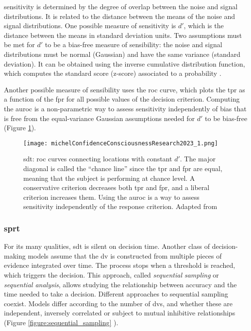 \Gls{sensitivity} is determined by the degree of overlap between the noise and signal distributions. It is related to the distance between the means of the noise and signal distributions. One possible measure of \gls{sensitivity} is $d'$, which is the distance between the means in standard deviation units. Two assumptions must be met for $d'$ to be a bias-free measure of sensibility: the noise and signal distributions must be normal (Gaussian) and have the same variance (standard deviation). It can be obtained using the inverse cumulative distribution function, which computes the standard score (z-score) associated to a probability \cite{stanislawCalculationSignalDetection1999}.

Another possible measure of sensibility uses the \acrfull{roc} curve, which plots the \acrlong{tpr} as a function of the \acrlong{fpr} for all possible values of the decision criterion. Computing the \acrfull{auroc} is a non-parametric way to assess \gls{sensitivity} independently of bias that is free from the equal-variance Gaussian assumptions needed for $d'$ to be bias-free \cite{flemingHowMeasureMetacognition2014} (Figure \ref{figure:roc_curves}).

\begin{figure}[ht]
    \centering
    \texttt{[image: michelConfidenceConsciousnessResearch2023\_1.png]}
    \caption[\acrlong{sdt}: \acrshort{roc} curves]{\acrlong{sdt}: \acrshort{roc} curves connecting locations with constant $d'$. The major diagonal is called the “chance line” since the \acrlong{tpr} and \acrlong{fpr} are equal, meaning that the subject is performing at chance level. A conservative criterion decreases both \acrshort{tpr} and \acrshort{fpr}, and a liberal criterion increases them. Using the \acrlong{auroc} is a way to assess \gls{sensitivity} independently of the response criterion. Adapted from \cite{michelConfidenceConsciousnessResearch2023}}
    \label{figure:roc_curves}
\end{figure}

\subsubsection{\acrlong{sprt}}

For its many qualities, \acrlong{sdt} is silent on decision time. Another class of decision-making models assume that the \acrshort{dv} is constructed from multiple pieces of evidence integrated over time. The process stops when a threshold is reached, which triggers the decision. This approach, called \textit{sequential sampling} or \textit{sequential analysis}, allows studying the relationship between accuracy and the time needed to take a decision. Different approaches to sequential sampling coexist. Models differ according to the number of \acrlong{dv}s, and whether these are independent, inversely correlated or subject to mutual inhibitive relationships (Figure \ref{figure:sequential_sampling} ).

